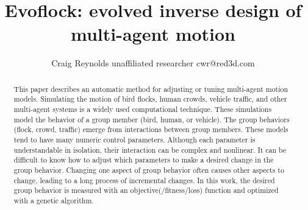 \documentclass[letterpaper]{article}
\begin{document}
\title{Evoflock: evolved inverse design of multi-agent motion}

\author{Craig Reynolds\authorcr
    unaffiliated researcher\authorcr 
    cwr@red3d.com}


\captionsetup{hypcap=false}


\date{}

\maketitle



\begin{abstract}
    This paper describes an automatic method for adjusting or tuning multi-agent motion models. Simulating the motion of bird flocks, human crowds, vehicle traffic, and other multi-agent systems is a widely used computational technique. These simulations model the behavior of a group member (bird, human, or vehicle). The group behaviors (flock, crowd, traffic) emerge from interactions between group members. These models tend to have many numeric control parameters. Although each parameter is understandable in isolation, their interaction can be complex and nonlinear. It can be difficult to know how to adjust which parameters to make a desired change in the group behavior. Changing one aspect of group behavior often causes other aspects to change, leading to a long process of incremental changes. In this work, the desired group behavior is measured with an objective(/fitness/loss) function and optimized with a genetic algorithm.
\end{abstract}
\end{document}
